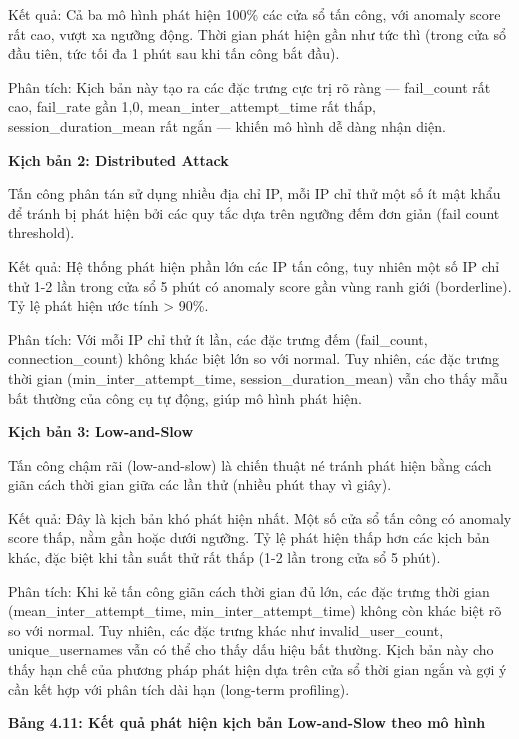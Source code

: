 \documentclass[
  a4paper]{report}
\begin{document}
Kết quả: Cả ba mô hình phát hiện 100\% các cửa sổ tấn công, với anomaly
score rất cao, vượt xa ngưỡng động. Thời gian phát hiện gần như tức thì
(trong cửa sổ đầu tiên, tức tối đa 1 phút sau khi tấn công bắt đầu).

Phân tích: Kịch bản này tạo ra các đặc trưng cực trị rõ ràng ---
fail\_count rất cao, fail\_rate gần 1,0, mean\_inter\_attempt\_time rất
thấp, session\_duration\_mean rất ngắn --- khiến mô hình dễ dàng nhận
diện.

\textbf{Kịch bản 2: Distributed Attack}

Tấn công phân tán sử dụng nhiều địa chỉ IP, mỗi IP chỉ thử một số ít mật
khẩu để tránh bị phát hiện bởi các quy tắc dựa trên ngưỡng đếm đơn giản
(fail count threshold).

Kết quả: Hệ thống phát hiện phần lớn các IP tấn công, tuy nhiên một số
IP chỉ thử 1-2 lần trong cửa sổ 5 phút có anomaly score gần vùng ranh
giới (borderline). Tỷ lệ phát hiện ước tính \textgreater{} 90\%.

Phân tích: Với mỗi IP chỉ thử ít lần, các đặc trưng đếm (fail\_count,
connection\_count) không khác biệt lớn so với normal. Tuy nhiên, các đặc
trưng thời gian (min\_inter\_attempt\_time, session\_duration\_mean) vẫn
cho thấy mẫu bất thường của công cụ tự động, giúp mô hình phát hiện.

\textbf{Kịch bản 3: Low-and-Slow}

Tấn công chậm rãi (low-and-slow) là chiến thuật né tránh phát hiện bằng
cách giãn cách thời gian giữa các lần thử (nhiều phút thay vì giây).

Kết quả: Đây là kịch bản khó phát hiện nhất. Một số cửa sổ tấn công có
anomaly score thấp, nằm gần hoặc dưới ngưỡng. Tỷ lệ phát hiện thấp hơn
các kịch bản khác, đặc biệt khi tần suất thử rất thấp (1-2 lần trong cửa
sổ 5 phút).

Phân tích: Khi kẻ tấn công giãn cách thời gian đủ lớn, các đặc trưng
thời gian (mean\_inter\_attempt\_time, min\_inter\_attempt\_time) không
còn khác biệt rõ so với normal. Tuy nhiên, các đặc trưng khác như
invalid\_user\_count, unique\_usernames vẫn có thể cho thấy dấu hiệu bất
thường. Kịch bản này cho thấy hạn chế của phương pháp phát hiện dựa trên
cửa sổ thời gian ngắn và gợi ý cần kết hợp với phân tích dài hạn
(long-term profiling).

\textbf{Bảng 4.11: Kết quả phát hiện kịch bản Low-and-Slow theo mô hình}
\end{document}
